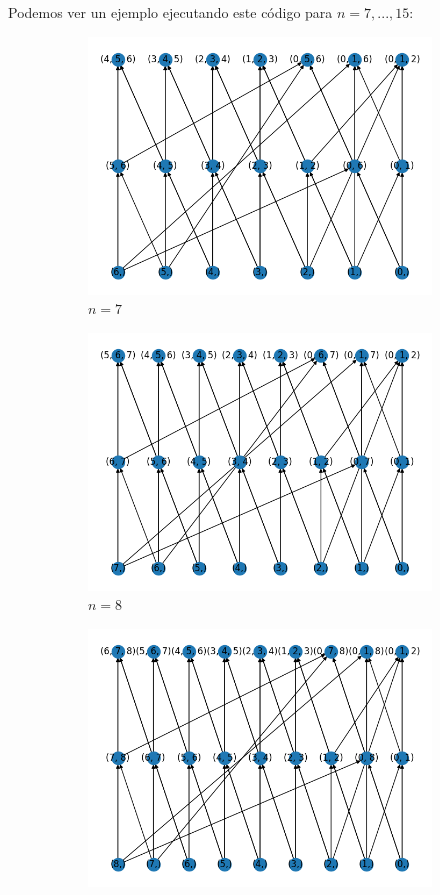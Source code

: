 Podemos ver un ejemplo ejecutando este código para $ n = 7,..., 15$:
\begin{figure}[h]
    \begin{subfigure}{.5\textwidth}
      \centering
      \includegraphics[width=.8\linewidth]{7.png}
      \caption{$n = 7$}
    \end{subfigure}%
    \begin{subfigure}{.5\textwidth}
      \centering
      \includegraphics[width=.8\linewidth]{8.png}
      \caption{$ n = 8 $}
    \end{subfigure}
    \begin{subfigure}{.5\textwidth}
        \centering
        \includegraphics[width=.8\linewidth]{9.png}

\end{subfigure}
\end{figure}
